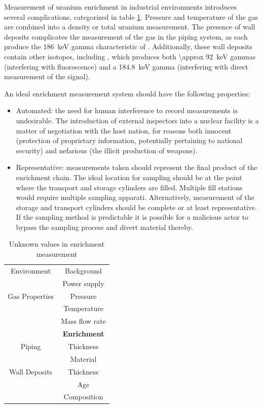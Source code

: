 \documentclass{IEEEtran}
\begin{document}
Measurement of uranium enrichment in industrial environments introduces several complications, categorized in table \ref{tab:unknowns}. Pressure and temperature of the  gas are combined into a density or total uranium measurement. The presence of wall deposits complicates the measurement of the gas in the piping system, as each produce the \SI{186}{\kilo\electronvolt} gamma characteristic of . Additionally, these wall deposits contain other isotopes, including , which produces both \SI{\approx 92}{\kilo\electronvolt} gammas (interfering with  fluorescence) and a \SI{184.8}{\kilo\electronvolt} gamma (interfering with direct measurement of the  signal). 

An ideal enrichment measurement system should have the following properties:

\begin{itemize}
	\item Automated: the need for human interference to record measurements is undesirable. The introduction of external inspectors into a nuclear facility is a matter of negotiation with the host nation, for reasons both innocent (protection of proprietary information, potentially pertaining to national security) and nefarious (the illicit production of weapons).
	\item Representative: measurements taken should represent the final product of the enrichment chain. The ideal location for sampling should be at the point where the transport and storage cylinders are filled. Multiple fill stations would require multiple sampling apparati. Alternatively, measurement of the storage and transport cylinders should be complete or at least representative. If the sampling method is predictable it is possible for a malicious actor to bypass the sampling process and divert material thereby.
\end{itemize}

\begin{center}
\begin{centering}
\begin{table}
	\centering
	\caption{Unknown values in enrichment measurement\label{tab:unknowns}}
	\begin{tabular}{c c}
		\hline
		Environment & Background \\
		& Power supply \\
		\hline
		Gas Properties & Pressure \\
		& Temperature \\
		& Mass flow rate \\
		& \textbf{Enrichment} \\
		\hline
		Piping & Thickness \\
		& Material \\
		\hline
		Wall Deposits & Thickness \\
		& Age \\
		& Composition \\
		\hline
	\end{tabular}
\end{table}
\end{centering}
\end{center}
\end{document}
